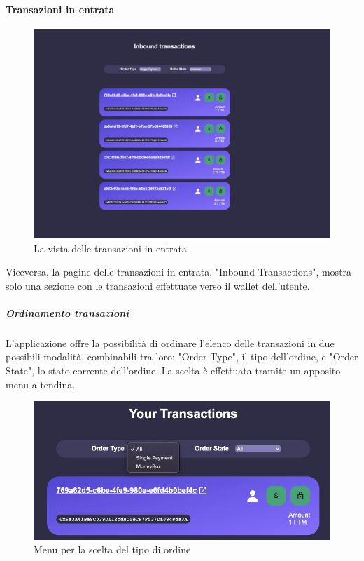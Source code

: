                 \paragraph{Transazioni in entrata}

                \begin{figure}[H]
                    \centering
                    \includegraphics[scale=0.4]{immagini/inboundtransactions.jpg}
                    \caption{La vista delle transazioni in entrata}
                \end{figure}

                Viceversa, la pagine delle transazioni in entrata, "Inbound Transactions", mostra solo una sezione con le transazioni effettuate verso il wallet dell'utente.

                \subparagraph{Ordinamento transazioni}

                L'applicazione offre la possibilità di ordinare l'elenco delle transazioni in due possibili modalità, combinabili tra loro: 
                "Order Type", il tipo dell'ordine, e "Order State", lo stato corrente dell'ordine.
                La scelta è effettuata tramite un apposito menu a tendina.

                \begin{figure}[H]
                    \centering
                    \includegraphics[scale=0.4]{immagini/ordertype.jpg}
                \caption{Menu per la scelta del tipo di ordine}
                \end{figure}

